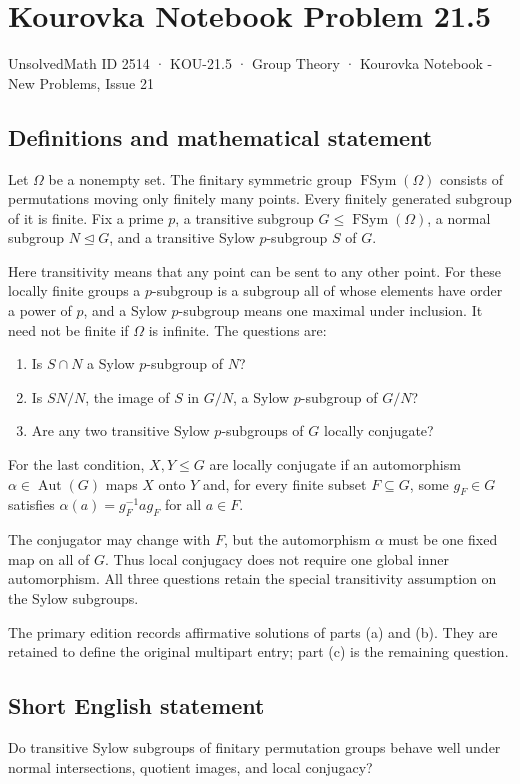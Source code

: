 \documentclass[11pt,a4paper]{article}
\begin{document}
\section*{Kourovka Notebook Problem 21.5}\label{2514}
{\small UnsolvedMath ID 2514 · KOU-21.5 · Group Theory · Kourovka Notebook - New Problems, Issue 21}
\subsection{Definitions and mathematical statement}
Let $\Omega$ be a nonempty set. The finitary symmetric group
$\operatorname{FSym}(\Omega)$ consists of permutations moving only finitely
many points. Every finitely generated subgroup of it is finite.
Fix a prime $p$, a transitive subgroup $G\le\operatorname{FSym}(\Omega)$,
a normal subgroup $N\trianglelefteq G$, and a transitive Sylow
$p$-subgroup $S$ of $G$.

Here transitivity means that any point can be sent to any other point.
For these locally finite groups a $p$-subgroup is a subgroup all of whose
elements have order a power of $p$, and a Sylow $p$-subgroup means one
maximal under inclusion. It need not be finite if $\Omega$ is infinite.
The questions are:
\begin{enumerate}
\item Is $S\cap N$ a Sylow $p$-subgroup of $N$?
\item Is $SN/N$, the image of $S$ in $G/N$, a Sylow $p$-subgroup of $G/N$?
\item Are any two transitive Sylow $p$-subgroups of $G$ locally conjugate?
\end{enumerate}
For the last condition, $X,Y\le G$ are locally conjugate if an
automorphism $\alpha\in\operatorname{Aut}(G)$ maps $X$ onto $Y$ and,
for every finite subset $F\subseteq G$, some $g_F\in G$ satisfies
$\alpha(a)=g_F^{-1}ag_F$ for all $a\in F$.

The conjugator may change with $F$, but the automorphism $\alpha$ must
be one fixed map on all of $G$. Thus local conjugacy does not require
one global inner automorphism. All three questions retain the special
transitivity assumption on the Sylow subgroups.

The primary edition records affirmative solutions of parts (a) and (b).
They are retained to define the original multipart entry; part (c) is
the remaining question.
\subsection{Short English statement}
Do transitive Sylow subgroups of finitary permutation groups behave well under normal intersections, quotient images, and local conjugacy?
\end{document}
